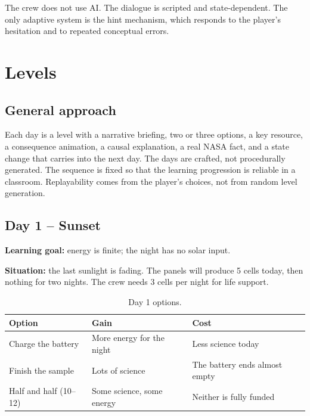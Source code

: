 \documentclass[11pt,a4paper]{article}
\begin{document}
The crew does not use AI. The dialogue is scripted and state-dependent. The only adaptive system is the hint mechanism, which responds to the player's hesitation and to repeated conceptual errors.

\section{Levels}

\subsection{General approach}

Each day is a level with a narrative briefing, two or three options, a key resource, a consequence animation, a causal explanation, a real NASA fact, and a state change that carries into the next day. The days are crafted, not procedurally generated. The sequence is fixed so that the learning progression is reliable in a classroom. Replayability comes from the player's choices, not from random level generation.

\subsection{Day 1 -- Sunset}

\textbf{Learning goal:} energy is finite; the night has no solar input.

\textbf{Situation:} the last sunlight is fading. The panels will produce 5 cells today, then nothing for two nights. The crew needs 3 cells per night for life support.

\begin{table}[H]
\centering
\small
\begin{tabular}{@{}p{4.2cm}p{4.6cm}p{5.6cm}@{}}
\toprule
\textbf{Option} & \textbf{Gain} & \textbf{Cost}\\
\midrule
Charge the battery & More energy for the night & Less science today\\
Finish the sample & Lots of science & The battery ends almost empty\\
Half and half (10--12) & Some science, some energy & Neither is fully funded\\
\bottomrule
\end{tabular}
\caption{Day 1 options.}
\label{tab:day1}
\end{table}
\end{document}
